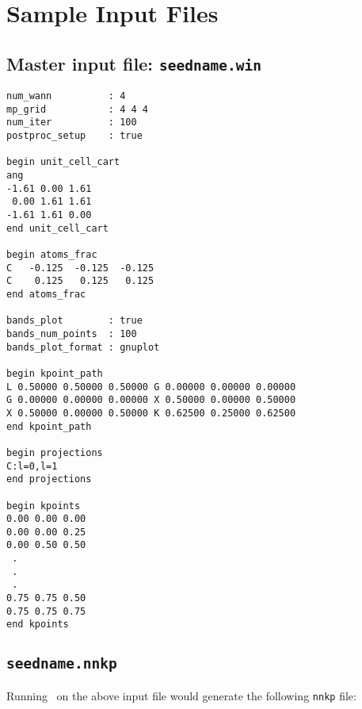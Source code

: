 \chapter{Sample Input Files}\label{chap:files}

\section{Master input file: {\tt seedname.win}}\label{winfile}

\begin{verbatim}
num_wann          : 4
mp_grid           : 4 4 4
num_iter          : 100
postproc_setup    : true

begin unit_cell_cart
ang
-1.61 0.00 1.61
 0.00 1.61 1.61
-1.61 1.61 0.00
end unit_cell_cart

begin atoms_frac
C   -0.125  -0.125  -0.125
C    0.125   0.125   0.125
end atoms_frac

bands_plot        : true
bands_num_points  : 100
bands_plot_format : gnuplot

begin kpoint_path
L 0.50000 0.50000 0.50000 G 0.00000 0.00000 0.00000
G 0.00000 0.00000 0.00000 X 0.50000 0.00000 0.50000
X 0.50000 0.00000 0.50000 K 0.62500 0.25000 0.62500
end kpoint_path

begin projections
C:l=0,l=1
end projections

begin kpoints
0.00 0.00 0.00
0.00 0.00 0.25
0.00 0.50 0.50
 .
 .
 .
0.75 0.75 0.50
0.75 0.75 0.75
end kpoints

\end{verbatim}

\section{{\tt seedname.nnkp}}\label{nnkp-file}
Running \wannier\ on the above input file would generate the
following \verb#nnkp# file:

